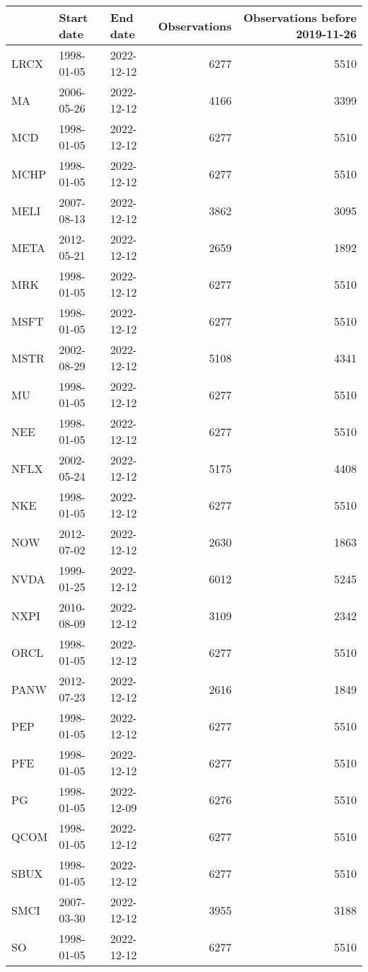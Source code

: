 \begin{table}[ht]
\centering
\begin{tabular}{lllrr}
  \hline
 & Start date & End date & Observations & Observations before 2019-11-26 \\ 
  \hline
LRCX & 1998-01-05 & 2022-12-12 & 6277 & 5510 \\ 
  MA & 2006-05-26 & 2022-12-12 & 4166 & 3399 \\ 
  MCD & 1998-01-05 & 2022-12-12 & 6277 & 5510 \\ 
  MCHP & 1998-01-05 & 2022-12-12 & 6277 & 5510 \\ 
  MELI & 2007-08-13 & 2022-12-12 & 3862 & 3095 \\ 
  META & 2012-05-21 & 2022-12-12 & 2659 & 1892 \\ 
  MRK & 1998-01-05 & 2022-12-12 & 6277 & 5510 \\ 
  MSFT & 1998-01-05 & 2022-12-12 & 6277 & 5510 \\ 
  MSTR & 2002-08-29 & 2022-12-12 & 5108 & 4341 \\ 
  MU & 1998-01-05 & 2022-12-12 & 6277 & 5510 \\ 
  NEE & 1998-01-05 & 2022-12-12 & 6277 & 5510 \\ 
  NFLX & 2002-05-24 & 2022-12-12 & 5175 & 4408 \\ 
  NKE & 1998-01-05 & 2022-12-12 & 6277 & 5510 \\ 
  NOW & 2012-07-02 & 2022-12-12 & 2630 & 1863 \\ 
  NVDA & 1999-01-25 & 2022-12-12 & 6012 & 5245 \\ 
  NXPI & 2010-08-09 & 2022-12-12 & 3109 & 2342 \\ 
  ORCL & 1998-01-05 & 2022-12-12 & 6277 & 5510 \\ 
  PANW & 2012-07-23 & 2022-12-12 & 2616 & 1849 \\ 
  PEP & 1998-01-05 & 2022-12-12 & 6277 & 5510 \\ 
  PFE & 1998-01-05 & 2022-12-12 & 6277 & 5510 \\ 
  PG & 1998-01-05 & 2022-12-09 & 6276 & 5510 \\ 
  QCOM & 1998-01-05 & 2022-12-12 & 6277 & 5510 \\ 
  SBUX & 1998-01-05 & 2022-12-12 & 6277 & 5510 \\ 
  SMCI & 2007-03-30 & 2022-12-12 & 3955 & 3188 \\ 
  SO & 1998-01-05 & 2022-12-12 & 6277 & 5510 \\ 

\end{tabular}
\end{table}
